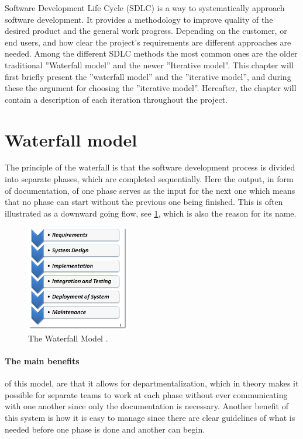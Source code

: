 Software Development Life Cycle (SDLC) is a way to systematically approach software development.
It provides a methodology to improve quality of the desired product and the general work progress. 
Depending on the customer, or end users, and how clear the project's requirements are different approaches are needed. 
Among the different SDLC methods the most common ones are the older traditional ''Waterfall model'' and the newer ''Iterative model''. \cite{SDLC-Toolsqa}
This chapter will first briefly present the ''waterfall model'' and the ''iterative model'', and during these the argument for choosing the ''iterative model''.
Hereafter, the chapter will contain a description of each iteration throughout the project.


\section{Waterfall model}\label{sec:WaterfallModel}
The principle of the waterfall \cite{Waterfall-Toolsqa} is that the software development process is divided into separate phases,
which are completed sequentially.
Here the output, in form of documentation, of one phase serves as the input for the next one which means that no phase can start without the previous one being finished.
This is often illustrated as a downward going flow, see \cref{fig:Waterfall}, which is also the reason for its name.

\begin{figure}[H]
	\centering
	\includegraphics[width=0.4\textwidth]{billeder/WaterFall-Model.png}
	\caption{The Waterfall Model \cite{Waterfall-Toolsqa}.}\label{fig:Waterfall}
\end{figure}

\paragraph{The main benefits} of this model, are that it allows for departmentalization, which in theory makes it possible for separate teams to work at each phase without ever communicating with one another since only the documentation is necessary.
Another benefit of this system is how it is easy to manage since there are clear guidelines of what is needed before one phase is done and another can begin.

